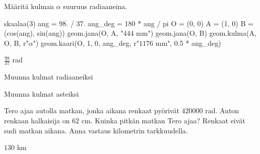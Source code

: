 \begin{tehtavasivu}
\begin{tehtava}
Määritä kulman $\alpha$ suuruus radiaaneina.

\begin{kuva}
skaalaa(3)
ang = 98. / 37.
ang_deg = 180 * ang / pi
O = (0, 0)
A = (1, 0)
B = (cos(ang), sin(ang))
geom.jana(O, A, "$444$ mm")
geom.jana(O, B)
geom.kulma(A, O, B, r"$\alpha$")
geom.kaari(O, 1, 0, ang_deg, r"$1176$ mm", 0.5 * ang_deg)
\end{kuva}

\begin{vastaus}
$\frac{98}{37}$ rad
\end{vastaus}
\end{tehtava}

\begin{tehtava}
Muunna kulmat radiaaneiksi
\begin{alakohdat}
\end{alakohdat}

\begin{vastaus}
\begin{alakohdat}
\end{alakohdat}
\end{vastaus}
\end{tehtava}

\begin{tehtava}
Muunna kulmat asteiksi
\begin{alakohdat}
\end{alakohdat}

\begin{vastaus}
\begin{alakohdat}
\end{alakohdat}
\end{vastaus}
\end{tehtava}

\begin{tehtava}
Tero ajaa autolla matkan, jonka aikana renkaat pyörivät $420000$ rad. Auton renkaan halkaisija on $62$ cm. Kuinka pitkän matkan Tero ajaa? Renkaat eivät sudi matkan aikana. Anna vastaus kilometrin tarkkuudella.
\begin{vastaus}
$130$ km
\end{vastaus}
\end{tehtava}

\end{tehtavasivu}
